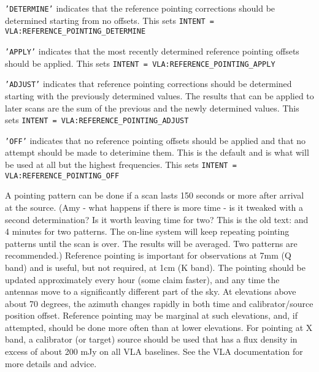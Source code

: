 \documentclass{report}
\begin{document}
\begin{description}

\item {\tt 'DETERMINE'} indicates that the reference pointing
corrections should be determined starting from no offsets.  This sets
{\tt INTENT = VLA:REFERENCE\_POINTING\_DETERMINE}

\item {\tt 'APPLY'} indicates that the most recently determined reference
pointing offsets should be applied.  This sets {\tt INTENT =
VLA:REFERENCE\_POINTING\_APPLY}

\item {\tt 'ADJUST'} indicates that reference pointing corrections should be
determined starting with the previously determined values.  The
results that can be applied to later scans are the sum of the previous
and the newly determined values.  This sets {\tt INTENT =
VLA:REFERENCE\_POINTING\_ADJUST}

\item {\tt 'OFF'} indicates that no reference pointing offsets should be
applied and that no attempt should be made to deterimine them.  This
is the default and is what will be used at all but the highest 
frequencies.  This sets {\tt INTENT = VLA:REFERENCE\_POINTING\_OFF}

\end{description}

A pointing pattern can be done if a scan lasts 150 seconds or more
after arrival at the source.  (Amy - what happens if there is more
time - is it tweaked with a second determination? Is it worth leaving
time for two?  This is the old text: and 4 minutes for two
patterns. The on-line system will keep repeating pointing patterns
until the scan is over.  The results will be averaged.  Two patterns
are recommended.)  Reference pointing is important for observations at
7mm (Q band) and is useful, but not required, at 1cm (K band).  The
pointing should be updated approximately every hour (some claim
faster), and any time the antennas move to a significantly different
part of the sky. At elevations above about 70 degrees, the azimuth
changes rapidly in both time and calibrator/source position offset.
Reference pointing may be marginal at such elevations, and, if
attempted, should be done more often than at lower elevations.  For
pointing at X band, a calibrator (or target) source should be used
that has a flux density in excess of about 200 mJy on all VLA
baselines.  See the VLA documentation for more details and advice.
\end{document}
